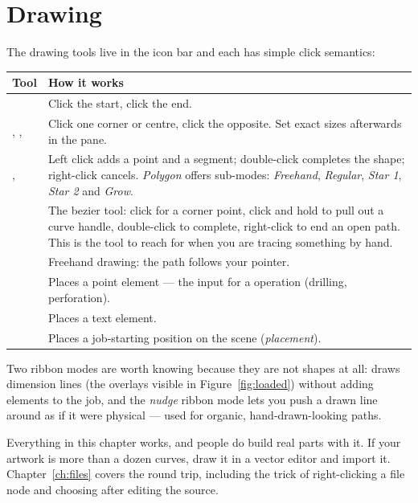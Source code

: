 \section{Drawing}

The drawing tools live in the  icon bar and each has simple click
semantics:

\begin{center}\small
\begin{tabular}{@{}L{2.6cm}L{11.6cm}@{}}
\toprule
\textbf{Tool} & \textbf{How it works} \\
\midrule
{} & Click the start, click the end. \\
, ,  & Click one corner or centre, click
the opposite. Set exact sizes afterwards in the  pane. \\
,  & Left click adds a point and a segment;
double-click completes the shape; right-click cancels.
\emph{Polygon} offers sub-modes: \emph{Freehand}, \emph{Regular},
\emph{Star 1}, \emph{Star 2} and \emph{Grow}. \\
 & The bezier tool: click for a corner point, click and hold to pull
out a curve handle, double-click to complete, right-click to end an open path.
This is the tool to reach for when you are tracing something by hand. \\
 & Freehand drawing: the path follows your pointer. \\
 & Places a point element --- the input for a 
operation (drilling, perforation). \\
 & Places a text element. \\
 & Places a job-starting position on the scene
(\emph{placement}). \\
\bottomrule
\end{tabular}
\end{center}

\noindent Two ribbon modes are worth knowing because they are not shapes at all:
 draws dimension lines (the overlays visible in
Figure~\ref{fig:loaded}) without adding elements to the job, and the
\emph{nudge} ribbon mode lets you push a drawn line around as if it were physical
--- used for organic, hand-drawn-looking paths.

\begin{notebox}
Everything in this chapter works, and people do build real parts with it. If
your artwork is more than a dozen curves, draw it in a vector editor and import
it. Chapter~\ref{ch:files} covers the round trip, including the trick of
right-clicking a file node and choosing  after editing the source.
\end{notebox}

